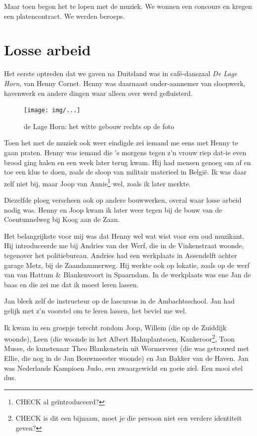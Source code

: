 \documentclass[12pt,twoside]{memoir}
\begin{document}
Maar toen begon het te lopen met de muziek. We wonnen een concours en kregen een platencontract. We werden beroeps. 


\chapter{Losse arbeid} %
\label{cha:lossearbeid}

Het eerste optreden dat we gaven na Duitsland was in café-danszaal \emph{De Lage Horn}, van Henny Cornet. Henny was daarnaast onder-aannemer van sloopwerk, havenwerk en andere dingen waar alleen over werd gefluisterd. 

\begin{figure}[t]
\texttt{[image: img/...]}
\caption{de Lage Horn: het witte gebouw rechts op de foto}
\end{figure}

Toen het met de muziek ook weer eindigde zei iemand me eens met Henny te gaan praten. Henny was iemand die ’s morgens tegen z’n vrouw riep dat-ie even brood ging halen en een week later terug kwam. Hij had mensen genoeg om af en toe een klus te doen, zoals de sloop van militair materieel in België. Ik was daar zelf niet bij, maar Joop van Annie\footnote{CHECK al geïntroduceerd?} wel, zoals ik later merkte. 

Diezelfde ploeg verscheen ook op andere bouwwerken, overal waar losse arbeid nodig was. Henny en Joop kwam ik later weer tegen bij de bouw van de Coentunnelweg bij Koog aan de Zaan. 

Het belangrijkste voor mij was dat Henny wel wat wist voor een oud muzikant. Hij introduceerde me bij Andries van der Werf, die in de Vinkenstraat woonde, tegenover het politiebureau. Andries had een werkplaats in Assendelft achter garage Metz, bij de Zaandammerweg. Hij werkte ook op lokatie, zoals op de werf van van Hattum \& Blankenvoort in Spaarndam. In de werkplaats was ene Jan de baas en die zei me dat ik moest leren lassen. 

Jan bleek zelf de instructeur op de lascursus in de Ambachtsschool. Jan had gelijk met z’n voorstel om te leren lassen, het beviel me wel.

Ik kwam in een groepje terecht rondom Joop, Willem (die op de Zuiddijk woonde), Leen (die woonde in het Albert Hahnplantsoen, Kankeroor\footnote{CHECK is dit een bijnaam, moet je die persoon niet een verdere identiteit geven?}, Toon Musse, de kunstenaar Theo Blankenstein uit Wormerveer (die was  getrouwd met Ellie, die nog in de Jan Bouwmeester woonde) en Jan Bakker van de Haven. Jan was Nederlands Kampioen Judo, een zwaargewicht en goeie ziel. Een mooi stel dus.
\end{document}
